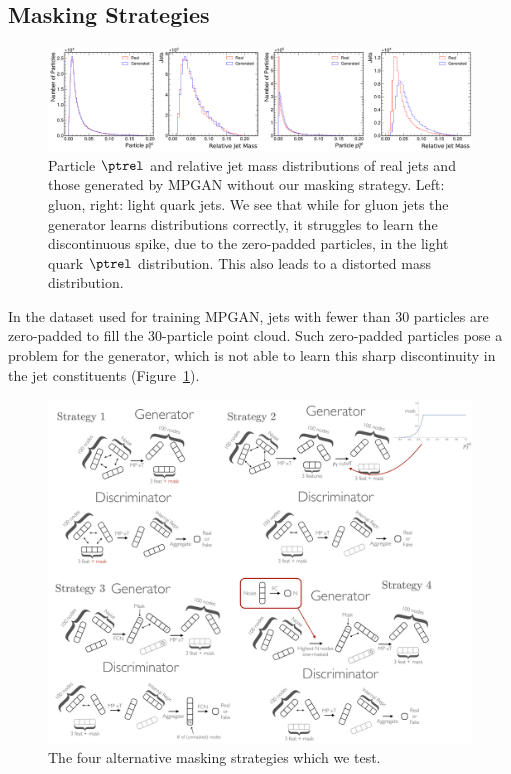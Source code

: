 \subsection{Masking Strategies}
\label{app:04_mpgan_masking}

\begin{figure}[t]
    \centering
    \centerline{\includegraphics[width=\textwidth]{figures/04-ML4Sim/mpgan/masking/zeropaddingfig.pdf}}
    \caption[Particle $\ptrel$ and relative jet mass distributions of real jets and those generated by MPGAN without our masking strategy.]{Particle $\ptrel$ and relative jet mass distributions of real jets and those generated by MPGAN without our masking strategy. Left: gluon, right: light quark jets.
    We see that while for gluon jets the generator learns distributions correctly, it struggles to learn the discontinuous spike, due to the zero-padded particles, in the light quark $\ptrel$ distribution.
    This also leads to a distorted mass distribution.
    }
    \label{fig:04_mpgan_zeropadding}
\end{figure}

In the \jetnet dataset used for training MPGAN, jets with fewer than 30 particles are zero-padded to fill the 30-particle point cloud.
Such zero-padded particles pose a problem for the generator, which is not able to learn this sharp discontinuity in the jet constituents (Figure~\ref{fig:04_mpgan_zeropadding}).


\begin{figure}[htpb]
    \centering
    \centerline{\includegraphics[width=\textwidth]{figures/04-ML4Sim/mpgan/masking/masking.pdf}}
    \caption{The four alternative masking strategies which we test.
    }
    \label{fig:04_mpgan_masking}
\end{figure}

